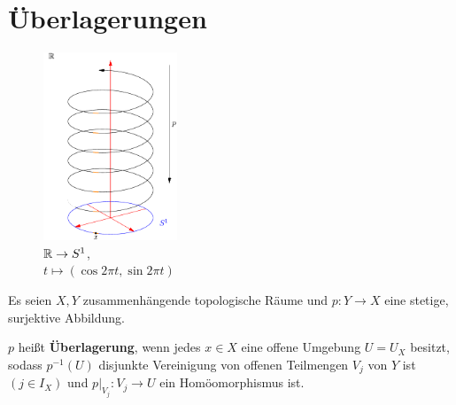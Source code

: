 \section{Überlagerungen}
\begin{figure}
    \centering
    \includegraphics[width=4cm, keepaspectratio]{figures/topology-r-spiral-covering-s.pdf}
    \caption{$\mathbb{R} \rightarrow S^1$,\\$t \mapsto (\cos 2 \pi t, \sin 2 \pi t)$}
    \label{fig:ueberlappung-r1-spirale-s1}
\end{figure}
\begin{definition}\label{def:12.1}%
    Es seien $X, Y$ zusammenhängende topologische Räume und
    $p: Y \rightarrow X$ eine stetige, surjektive Abbildung.

    $p$ heißt \textbf{Überlagerung}, wenn jedes $x \in X$ eine offene
    Umgebung $U = U_X$ besitzt, sodass $p^{-1}(U)$ disjunkte Vereinigung
    von offenen Teilmengen $V_j$ von $Y$ ist $(j \in I_X)$ und
    $p|_{V_j}: V_j \rightarrow U$ ein Homöomorphismus ist.
\end{definition}

